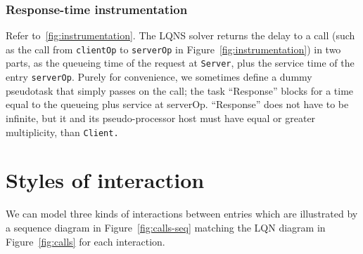 \documentclass[11pt]{article}
\begin{document}
\subsubsection{Response-time instrumentation} 
Refer to~\ref{fig:instrumentation}. The LQNS solver returns the delay to a
call (such as the call from \texttt{clientOp} to \texttt{serverOp} in Figure~\ref{fig:instrumentation}) in two parts, as the queueing time of
the request at \texttt{Server}, plus the service time of the entry \texttt{serverOp}. Purely for convenience, we
sometimes define a dummy pseudotask that simply passes on the call; the task ``Response'' blocks
for a time equal to the queueing plus service at serverOp. ``Response'' does not have to be infinite,
but it and its pseudo-processor host must have equal or greater multiplicity, than \texttt{Client.}

\section{Styles of interaction}
\label{sec:calls}

We can model three kinds of interactions between entries which are
illustrated by a sequence diagram in Figure~\ref{fig:calls-seq}
matching the LQN diagram in Figure~\ref{fig:calls} for each interaction.
\end{document}
